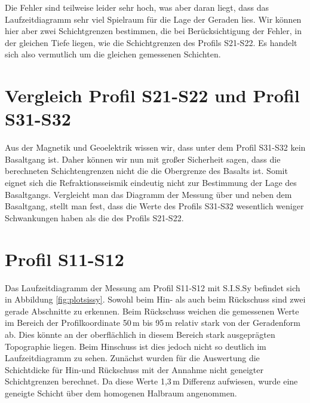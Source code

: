 



Die Fehler sind teilweise leider sehr hoch, was aber daran liegt, dass das Laufzeitdiagramm sehr viel Spielraum für die Lage der Geraden lies. 
Wir können hier aber zwei Schichtgrenzen bestimmen, die bei Berücksichtigung der Fehler, in der gleichen Tiefe liegen, wie die Schichtgrenzen des Profils S21-S22. Es handelt sich also vermutlich um die gleichen gemessenen Schichten.

\section{Vergleich Profil S21-S22 und Profil S31-S32}

Aus der Magnetik und Geoelektrik wissen wir, dass unter dem Profil S31-S32 kein Basaltgang ist. Daher können wir nun mit großer Sicherheit sagen, dass die berechneten Schichtengrenzen nicht die die Obergrenze des Basalts ist. Somit eignet sich die Refraktionsseismik eindeutig nicht zur Bestimmung der Lage des Basaltgangs. Vergleicht man das Diagramm der Messung über und neben dem Basaltgang, stellt man fest, dass die Werte des Profils S31-S32 wesentlich weniger Schwankungen haben als die des Profils S21-S22.

\section{Profil S11-S12}

Das Laufzeitdiagramm der Messung am Profil S11-S12 mit S.I.S.Sy befindet sich in Abbildung \ref{fig:plotsissy}. Sowohl beim Hin- als auch beim Rückschuss sind zwei gerade Abschnitte zu erkennen. Beim Rückschuss weichen die gemessenen Werte im Bereich der Profilkoordinate 50\,m bis 95\,m relativ stark von der Geradenform ab. Dies könnte an der oberflächlich in diesem Bereich stark ausgeprägten Topographie liegen. Beim Hinschuss ist dies jedoch nicht so deutlich im Laufzeitdiagramm zu sehen. Zunächst wurden für die Auswertung die Schichtdicke für Hin-und Rückschuss mit der Annahme nicht geneigter Schichtgrenzen berechnet. Da diese Werte 1,3\,m Differenz aufwiesen, wurde eine geneigte Schicht über dem homogenen Halbraum angenommen.

